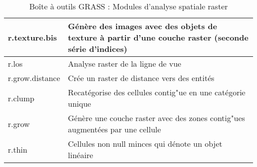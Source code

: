 \begin{table}[H]
{\begin{longtable}{|p{4cm}|p{10cm}|}
  \hline r.texture.bis & Génère des images avec des objets de texture à partir d'une couche raster (seconde série d'indices)\\
  \hline r.los & Analyse raster de la ligne de vue\\
  \hline r.grow.distance & Crée un raster de distance vers des entités \\
  \hline r.clump & Recatégorise des cellules contig"ue en une catégorie unique \\
  \hline r.grow & Génère une couche raster avec des zones contig"ues augmentées par une cellule\\
  \hline r.thin & Cellules non null minces qui dénote un objet linéaire \\
\hline
\end{longtable}}
\caption{Boîte à outils GRASS : Modules d'analyse spatiale raster}
\end{table}

